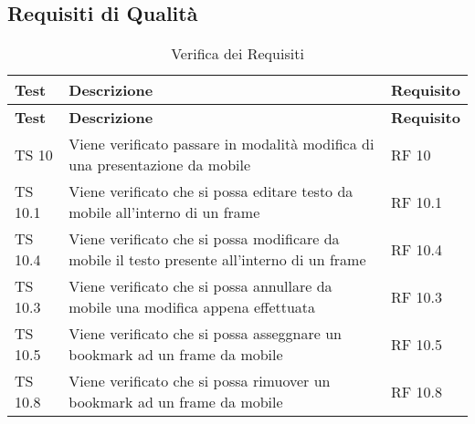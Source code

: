 \subsection{Requisiti di Qualità}{
		\renewcommand*{\arraystretch}{1.4}
		\begin{longtable} [c]{| p{3cm} | p{6cm} |p{3cm}|}
			\caption{Verifica dei Requisiti \label{tab:verReq}}\\
			 \hline
			 \textbf{Test} & \textbf{Descrizione} & \textbf{Requisito} \\
			 \hline
			 \endfirsthead
			 \hline
			 \textbf{Test} & \textbf{Descrizione} & \textbf{Requisito} \\
			 \hline
			\endhead
			 \hline
			 \endfoot
			 \hline
			 \endlastfoot
			TS 10 & Viene verificato passare in modalità modifica di una presentazione da mobile & RF 10\\
			\hline
			TS 10.1 & Viene verificato che si possa editare testo da mobile all'interno di un frame & RF 10.1\\
			\hline
			TS 10.4 & Viene verificato che si possa modificare da mobile il testo presente all'interno di un frame & RF 10.4\\
			\hline
			TS 10.3 & Viene verificato che si possa annullare da mobile una modifica appena effettuata & RF 10.3\\
			\hline
			TS 10.5 & Viene verificato che si possa asseggnare un bookmark ad un frame da mobile & RF 10.5\\
			\hline
			TS 10.8 & Viene verificato che si possa rimuover un bookmark ad un frame da mobile & RF 10.8\\
		\end{longtable}
	}